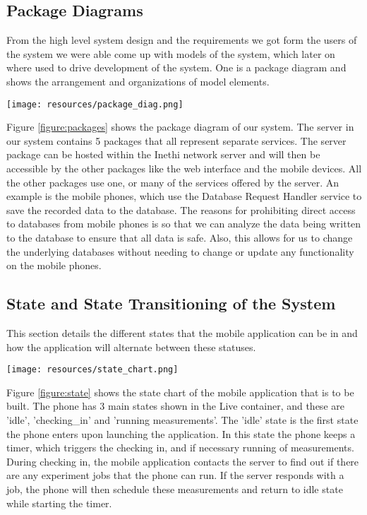 \subsection{Package Diagrams}\label{subsec:package-diagrams}
From the high level system design and the requirements we got form the users of the system we were able come up with models of the system, which later on where used to drive development of the system.
One is a package diagram and shows the arrangement and organizations of model elements.
\begin{figure*}
    \begin{center}
        \texttt{[image: resources/package\_diag.png]}
    \end{center}
    \caption{Showing UML package diagrams of the system.}
    \label{figure:packages}
\end{figure*}
Figure \ref{figure:packages} shows the package diagram of our system.
The server in our system contains 5 packages that all represent separate services.
The server package can be hosted within the Inethi network server and will then be accessible by the other packages like the web interface and the mobile devices.
All the other packages use one, or many of the services offered by the server.
An example is the mobile phones, which use the Database Request Handler service to save the recorded data to the database.
The reasons for prohibiting direct access to databases from mobile phones is so that we can analyze the data being written to the database to ensure that all data is safe.
Also, this allows for us to change the underlying databases without needing to change or update any functionality on the mobile phones.

\subsection{State and State Transitioning of the System}\label{subsec:state-and-state-transitioning-of-the-system}
This section details the different states that the mobile application can be in and how the application will alternate between these statuses.
\begin{figure*}
    \begin{center}
        \texttt{[image: resources/state\_chart.png]}
    \end{center}
    \caption{Showing State Machine Chart for the mobile application that we will be building}
    \label{figure:state}
\end{figure*}
Figure \ref{figure:state}  shows the state chart of the mobile application that is to be built.
The phone has 3 main states shown in the Live container, and these are 'idle', 'checking_in' and 'running measurements'.
The 'idle' state is the first state the phone enters upon launching the application.
In this state the phone keeps a timer, which triggers the checking in, and if necessary running of measurements.
During checking in, the mobile application contacts the server to find out if there are any experiment jobs that the phone can run.
If the server responds with a job, the phone will then schedule these measurements and return to idle state while starting the timer.


